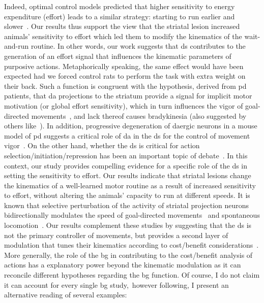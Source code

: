 Indeed, optimal control models predicted that higher sensitivity to energy expenditure (effort) leads to a similar strategy: starting to run earlier and slower~\cite{JuradoParras2020}.
Our results thus support the view that the striatal lesion increased animals' sensitivity to effort which led them to modify the kinematics of the wait-and-run routine.
In other words, our work suggests that \gls{ds} contributes to the generation of an effort signal that influences the kinematic parameters of purposive actions.
Metaphorically speaking, the same effect would have been expected had we forced control rats to perform the task with extra weight on their back.
Such a function is congruent with the hypothesis, derived from \gls{pd} patients, that \gls{da} projections to the striatum provide a signal for implicit motor motivation (or global effort sensitivity), which in turn influences the vigor of goal-directed movements~\cite{Mazzoni2007}, and lack thereof causes bradykinesia (also suggested by others like~\cite{Berke2018NN, Beeler2012Fron}).
In addition, progressive degeneration of \gls{da}ergic neurons in a mouse model of \gls{pd} suggests a critical role of \gls{da} in the \gls{ds} for the control of movement vigor~\cite{Panigrahi2015Cell}.
On the other hand, whether the \gls{ds} is critical for action selection/initiation/repression has been an important topic of debate~\cite{Turner2010CurrOpinNeurobiol, Dudman2016CurrOpinNeurobiol}.
In this context, our study provides compelling evidence for a specific role of the \gls{ds} in setting the sensitivity to effort.
Our results indicate that striatal lesions change the kinematics of a well-learned motor routine as a result of increased sensitivity to effort, without altering the animals' capacity to run at different speeds.
It is known that selective perturbation of the activity of striatal projection neurons bidirectionally modulates the speed of goal-directed movements~\cite{Yttri2016Nature} and spontaneous locomotion~\cite{Kravitz2010Nature}.
Our results complement these studies by suggesting that the \gls{ds} is not the primary controller of movements, but provides a second layer of modulation that tunes their kinematics according to cost/benefit considerations~\cite{Berke2018NN,Beeler2012Fron}.
More generally, the role of the \gls{bg} in contributing to the cost/benefit analysis of actions has a explanatory power beyond the kinematic modulation as it can reconcile different hypotheses regarding the \gls{bg} function.
Of course, I do not claim it can account for every single \gls{bg} study,\footnotemark\ however following, I present an alternative reading of several examples:

